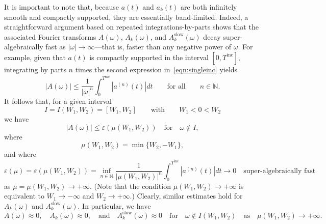 \documentclass[11pt]{article}
\theoremstyle{plain}
\theoremstyle{remark}
\begin{document}
It is important to note that, because $a(t)$ and $a_k(t)$ are both
infinitely smooth and compactly supported, they are essentially
band-limited. Indeed, a straightforward argument based on repeated
integrations-by-parts shows that the associated Fourier transforms
$A(\omega)$, $A_k(\omega)$, and $A_k^{\mathrm{slow}}(\omega)$ decay
super-algebraically fast as $|\omega| \to \infty$---that is, faster
than any negative power of $\omega$. For example, given that $a(t)$ is
compactly supported in the interval $[0,T^\mathrm{inc}]$, integrating
by parts $n$ times the second expression in~\eqref{eqn:singleinc}
yields
\begin{equation}\label{eqn:Asuperalg}
  |A(\omega)| \le  \frac{1}{|\omega|^n}\int_0^{T^\mathrm{inc}} |a^{(n)}(t)|dt\qquad \mbox{for all}\qquad n\in\mathbb{N}.
\end{equation}
It follows that, for a given interval 
\begin{equation}
  \label{eq:fr_int}
  I =I(W_1,W_2)= [W_1,W_2]\qquad\text{with} \qquad W_1< 0 < W_2
\end{equation}
we have
\begin{equation}\label{eqn:AepsBnd}
  |A(\omega)|\leq  \varepsilon(\mu(W_1,W_2))\quad\text{for} \quad \omega\not\in I,
\end{equation}
where
\begin{equation}\label{mu}
 \mu(W_1,W_2) = \min\{W_2,-W_1\},
\end{equation}
and where
\begin{equation}\label{eqn:eps_m_def}
  \varepsilon(\mu) = \varepsilon(\mu(W_1,W_2)) =\inf_{n \in \mathbb{N}} \frac{1}{|\mu(W_1,W_2)|^n}\int_0^{T^\mathrm{inc}} |a^{(n)}(t)|dt\to 0\quad\text{super-algebraically fast}
\end{equation}
as $\mu = \mu(W_1,W_2)\to +\infty$. (Note that the condition
$\mu(W_1,W_2)\to +\infty$ is equivalent to $W_1\to -\infty$ and
$W_2\to+\infty$.) Clearly, similar estimates hold for $A_k(\omega)$
and $A_k^{\mathrm{slow}}(\omega)$. In particular, we have
\begin{equation}
  \label{eq:band-limit-B}
  A(\omega) \approx 0,\quad A_k(\omega) \approx 0,\quad \mbox{and}\quad A_k^{\mathrm{slow}}(\omega)\approx 0\quad \mbox{for} \quad\omega\not\in I(W_1,W_2)\quad\mbox{as}\quad \mu(W_1,W_2)\to +\infty.
\end{equation}
\end{document}
